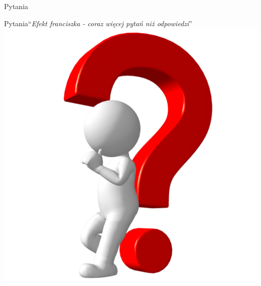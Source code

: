 \documentclass[14pt]{beamer}
\newcommand{\fakehead}[1]{``\textit{#1}''}
\begin{document}
\begin{section}{Pytania}
	\begin{frame}{Pytania}{\fakehead{Efekt franciszka - coraz więcej pytań niż odpowiedzi}}
		\centering
		\includegraphics[width=0.5\linewidth]{question.png}
	\end{frame}
\end{section}
\end{document}
